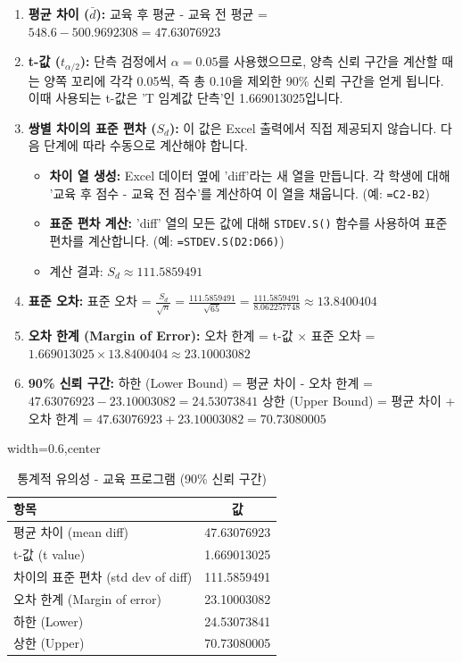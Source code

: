 \documentclass[11pt,a4paper]{article}
\theoremstyle{definition}
\begin{document}
\begin{enumerate}
    \item \textbf{평균 차이 ($\bar{d}$):}
    교육 후 평균 - 교육 전 평균 = $548.6 - 500.9692308 = 47.63076923$
    \item \textbf{t-값 ($t_{\alpha/2}$):}
    단측 검정에서 $\alpha = 0.05$를 사용했으므로, 양측 신뢰 구간을 계산할 때는 양쪽 꼬리에 각각 0.05씩, 즉 총 0.10을 제외한 90\% 신뢰 구간을 얻게 됩니다. 이때 사용되는 t-값은 'T 임계값 단측'인 1.669013025입니다.
    \item \textbf{쌍별 차이의 표준 편차 ($S_d$):}
    이 값은 Excel 출력에서 직접 제공되지 않습니다. 다음 단계에 따라 수동으로 계산해야 합니다.
    \begin{itemize}
        \item \textbf{차이 열 생성:} Excel 데이터 옆에 'diff'라는 새 열을 만듭니다. 각 학생에 대해 '교육 후 점수 - 교육 전 점수'를 계산하여 이 열을 채웁니다. (예: \texttt{=C2-B2})
        \item \textbf{표준 편차 계산:} 'diff' 열의 모든 값에 대해 \texttt{STDEV.S()} 함수를 사용하여 표준 편차를 계산합니다. (예: \texttt{=STDEV.S(D2:D66)})
        \item 계산 결과: $S_d \approx 111.5859491$
    \end{itemize}
    \item \textbf{표준 오차:}
    표준 오차 = $\frac{S_d}{\sqrt{n}} = \frac{111.5859491}{\sqrt{65}} = \frac{111.5859491}{8.062257748} \approx 13.8400404$
    \item \textbf{오차 한계 (Margin of Error):}
    오차 한계 = t-값 $\times$ 표준 오차 = $1.669013025 \times 13.8400404 \approx 23.10003082$
    \item \textbf{90\% 신뢰 구간:}
    하한 (Lower Bound) = 평균 차이 - 오차 한계 = $47.63076923 - 23.10003082 = 24.53073841$
    상한 (Upper Bound) = 평균 차이 + 오차 한계 = $47.63076923 + 23.10003082 = 70.73080005$
\end{enumerate}

\begin{table}[h!]
\caption{통계적 유의성 - 교육 프로그램 (90\% 신뢰 구간)}
\label{tab:training_ci}
\centering
\begin{adjustbox}{width=0.6\textwidth,center}
\begin{tabular}{lc}
\toprule
\textbf{항목} & \textbf{값} \\
\midrule
평균 차이 (mean diff) & 47.63076923 \\
t-값 (t value) & 1.669013025 \\
차이의 표준 편차 (std dev of diff) & 111.5859491 \\
오차 한계 (Margin of error) & 23.10003082 \\
하한 (Lower) & 24.53073841 \\
상한 (Upper) & 70.73080005 \\
\bottomrule
\end{tabular}
\end{adjustbox}
\end{table}
\end{document}
